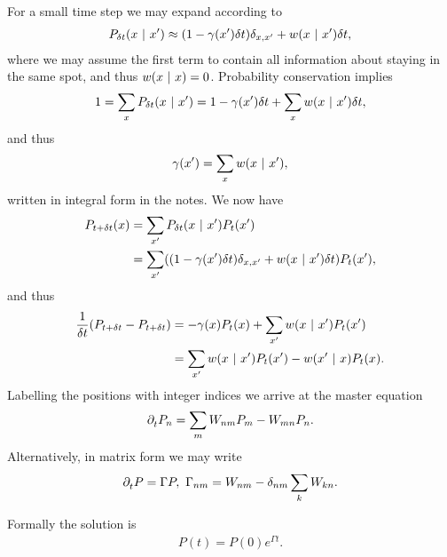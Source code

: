 For a small time step we may expand according to
\begin{align*}
	P_{\delta t}(x \ | \  x^{\prime}) \approx (1 - \gamma(x^{\prime})\delta t)\delta_{x, x^{\prime}} + w(x \ | \  x^{\prime})\delta t,
\end{align*}
where we may assume the first term to contain all information about staying in the same spot, and thus $w(x \ | \  x) = 0$. Probability conservation implies
\begin{align*}
	1 = \sum\limits_{x}P_{\delta t}(x \ | \  x^{\prime}) = 1 - \gamma(x^{\prime})\delta t + \sum\limits_{x}w(x \ | \  x^{\prime})\delta t,
\end{align*}
and thus
\begin{align*}
	\gamma(x^{\prime}) = \sum\limits_{x}w(x \ | \  x^{\prime}),
\end{align*}
written in integral form in the notes. We now have
\begin{align*}
	P_{t + \delta t}(x) &= \sum\limits_{x^{\prime}}P_{\delta t}(x \ | \  x^{\prime})P_{t}(x^{\prime}) \\
	                    &= \sum\limits_{x^{\prime}}((1 - \gamma(x^{\prime})\delta t)\delta_{x, x^{\prime}} + w(x \ | \  x^{\prime})\delta t)P_{t}(x^{\prime}),
\end{align*}
and thus
\begin{align*}
	\frac{1}{\delta t}(P_{t + \delta t} - P_{t + \delta t}) &= -\gamma(x)P_{t}(x) + \sum\limits_{x^{\prime}}w(x \ | \  x^{\prime})P_{t}(x^{\prime}) \\
	                                                        &= \sum\limits_{x^{\prime}}w(x \ | \  x^{\prime})P_{t}(x^{\prime}) - w(x^{\prime} \ | \  x)P_{t}(x).
\end{align*}
Labelling the positions with integer indices we arrive at the master equation
\begin{align*}
	\partial^{}_{t}{P_{n}} = \sum\limits_{m}W_{nm}P_{m} - W_{mn}P_{n}.
\end{align*}
Alternatively, in matrix form we may write
\begin{align*}
	\partial^{}_{t}{P} = \Gamma P,\ \Gamma_{nm} = W_{nm} - \delta_{nm}\sum\limits_{k}W_{kn}.
\end{align*}

Formally the solution is
\begin{align*}
	P(t) = P(0)e^{\Gamma t}.
\end{align*}

